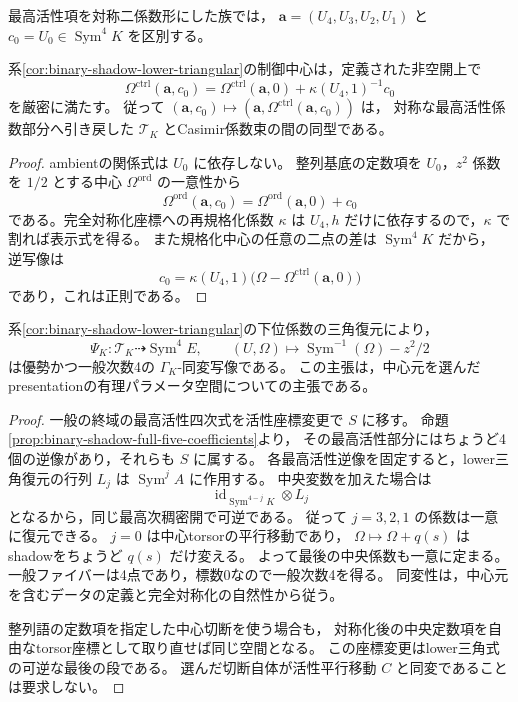 最高活性項を対称二係数形にした族では，
$\boldsymbol a=(U_4,U_3,U_2,U_1)$ と $c_0=U_0\in\operatorname{Sym}^4K$ を区別する。
\begin{lemma}[制御中心はtorsorの線型座標である]
\label{lem:controlled-center-torsor-coordinates}
系\ref{cor:binary-shadow-lower-triangular}の制御中心は，定義された非空開上で
\[
 \Omega^{\mathrm{ctrl}}(\boldsymbol a,c_0)
   =\Omega^{\mathrm{ctrl}}(\boldsymbol a,0)+\kappa(U_4,1)^{-1}c_0
\]
を厳密に満たす。
従って $(\boldsymbol a,c_0)\mapsto(\boldsymbol a,\Omega^{\mathrm{ctrl}}(\boldsymbol a,c_0))$ は，
対称な最高活性係数部分へ引き戻した $\mathcal T_K$ とCasimir係数束の間の同型である。
\end{lemma}
\begin{proof}
ambientの関係式は $U_0$ に依存しない。
整列基底の定数項を $U_0$，$z^2$ 係数を $1/2$ とする中心
$\Omega^{\mathrm{ord}}$ の一意性から
\[
             \Omega^{\mathrm{ord}}(\boldsymbol a,c_0)
                =\Omega^{\mathrm{ord}}(\boldsymbol a,0)+c_0
\]
である。完全対称化座標への再規格化係数 $\kappa$ は
$U_4,h$ だけに依存するので，$\kappa$ で割れば表示式を得る。
また規格化中心の任意の二点の差は $\operatorname{Sym}^4K$ だから，
逆写像は
\[
           c_0=\kappa(U_4,1)
                \bigl(\Omega-\Omega^{\mathrm{ctrl}}(\boldsymbol a,0)\bigr)
\]
であり，これは正則である。
\end{proof}

\begin{proposition}[中央係数を含むpresentationの次数]
\label{prop:central-presentation-shadow-degree-four}
系\ref{cor:binary-shadow-lower-triangular}の下位係数の三角復元により，
\[
 \Psi_K:\mathcal T_K\dashrightarrow\operatorname{Sym}^4E,
 \qquad
 (U,\Omega)\longmapsto
          \operatorname{Sym}^{-1}(\Omega)-z^2/2
\]
は優勢かつ一般次数4の $\Gamma_K$-同変写像である。
この主張は，中心元を選んだpresentationの有理パラメータ空間についての主張である。
\end{proposition}
\begin{proof}
一般の終域の最高活性四次式を活性座標変更で $S$ に移す。
命題\ref{prop:binary-shadow-full-five-coefficients}より，
その最高活性部分にはちょうど4個の逆像があり，それらも $S$ に属する。
各最高活性逆像を固定すると，lower三角復元の行列 $L_j$ は
$\operatorname{Sym}^j A$ に作用する。
中央変数を加えた場合は
\[
 \operatorname{id}_{\operatorname{Sym}^{4-j}K}\otimes L_j
\]
となるから，同じ最高次稠密開で可逆である。
従って $j=3,2,1$ の係数は一意に復元できる。
$j=0$ は中心torsorの平行移動であり，
$\Omega\mapsto\Omega+q(s)$ はshadowをちょうど $q(s)$ だけ変える。
よって最後の中央係数も一意に定まる。
一般ファイバーは4点であり，標数0なので一般次数4を得る。
同変性は，中心元を含むデータの定義と完全対称化の自然性から従う。

整列語の定数項を指定した中心切断を使う場合も，
対称化後の中央定数項を自由なtorsor座標として取り直せば同じ空間となる。
この座標変更はlower三角式の可逆な最後の段である。
選んだ切断自体が活性平行移動 $C$ と同変であることは要求しない。
\end{proof}


